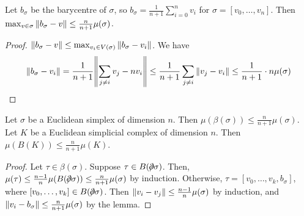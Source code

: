\begin{lemma}
	Let \( b_\sigma \) be the barycentre of \( \sigma \), so \( b_\sigma = \frac{1}{n+1} \sum_{i=0}^n v_i \) for \( \sigma = [v_0, \dots, v_n] \).
	Then \( \max_{v \in \sigma} \norm{b_\sigma - v} \leq \frac{n}{n+1} \mu(\sigma) \).
\end{lemma}
\begin{proof}
	\( \norm{b_\sigma - v} \leq \max_{v_i \in V(\sigma)} \norm{b_\sigma - v_i} \).
	We have
	\[ \norm{b_\sigma - v_i} = \frac{1}{n+1} \norm{\sum_{j \neq i} v_j - nv_i} \leq \frac{1}{n+1} \sum_{j \neq i} \norm{v_j - v_i} \leq \frac{1}{n+1} \cdot n\mu(\sigma) \]
\end{proof}
\begin{corollary}
	Let \( \sigma \) be a Euclidean simplex of dimension \( n \).
	Then \( \mu(\beta(\sigma)) \leq \frac{n}{n+1}\mu(\sigma) \).
	Let \( K \) be a Euclidean simplicial complex of dimension \( n \).
	Then \( \mu(B(K)) \leq \frac{n}{n+1}\mu(K) \).
\end{corollary}
\begin{proof}
	Let \( \tau \in \beta(\sigma) \).
	Suppose \( \tau \in B(\bound \sigma) \).
	Then, \( \mu(\tau) \leq \frac{n-1}{n}\mu(B(\bound\sigma)) \leq \frac{n}{n+1} \mu(\sigma) \) by induction.
	Otherwise, \( \tau = [v_0, \dots, v_k, b_\sigma] \), where \( [v_0, \dots, v_k] \in B(\bound\sigma) \).
	Then \( \norm{v_i - v_j} \leq \frac{n-1}{n} \mu(\sigma) \) by induction, and \( \norm{v_i - b_\sigma} \leq \frac{n}{n+1} \mu(\sigma) \) by the lemma.
\end{proof}

